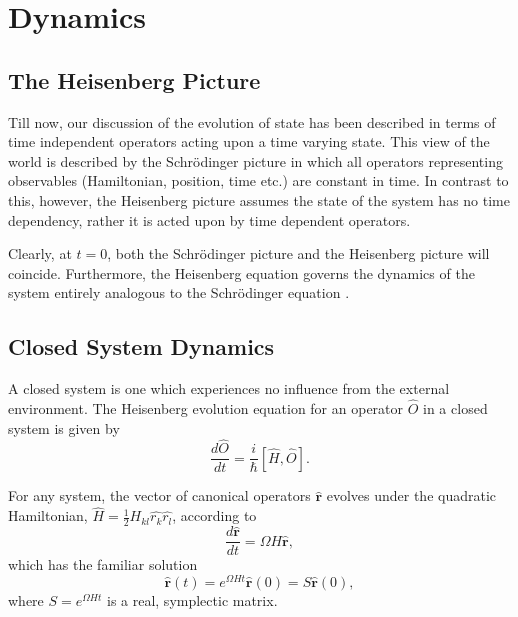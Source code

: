 \documentclass[11pt,a4paper,openbib]{article}
\numberwithin{equation}{section}
\begin{document}
\section{Dynamics}
\label{sec:dynamics}
\subsection{The Heisenberg Picture}
Till now, our discussion of the evolution of state has been described in terms of time independent operators acting upon a time varying state. This view of the world is described by the Schr{\"o}dinger picture in which all operators representing observables (Hamiltonian, position, time etc.) are constant in time. In contrast to this, however, the Heisenberg picture assumes the state of the system has no time dependency, rather it is acted upon by time dependent operators.

Clearly, at $t=0$, both the Schr{\"o}dinger picture and the Heisenberg picture will coincide. Furthermore, the Heisenberg equation governs the dynamics of the system entirely analogous to the Schr{\"o}dinger equation \cite{Fujita}.


\subsection{Closed System Dynamics}

A closed system is one which experiences no influence from the external environment. The Heisenberg evolution equation for an operator $\hat{O}$ in a closed system is given by \cite{Fujita}
\begin{equation*}
\frac{d\hat{O}}{dt} = \frac{i}{\hbar}[\hat{H}, \hat{O}].
\end{equation*}

For any system, the vector of canonical operators $\mathbf{\hat{r}}$ evolves under the quadratic Hamiltonian, $\hat{H} = \frac{1}{2} H_{k l}\hat{r_k}\hat{r_l}$, according to \cite{Genoni16} 
\begin{equation}\label{eq:31}
\frac{d \mathbf{\hat{r}}}{dt} = \Omega H \mathbf{\hat{r}},
\end{equation} which has the familiar solution
\begin{equation}\label{eq:32}
\mathbf{\hat{r}}(t) =e^{\Omega H t} \mathbf{\hat{r}}(0) = S\mathbf{\hat{r}}(0) ,
\end{equation}
where $S = e^{\Omega H t}$ is a real, symplectic matrix.
\end{document}

